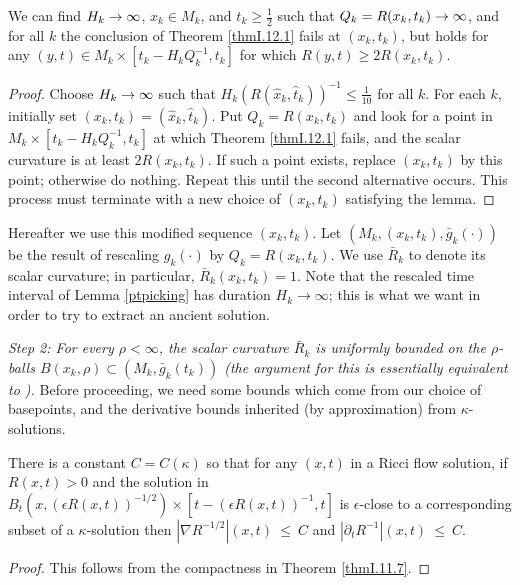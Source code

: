 \begin{lemma}
  \label{lem:kl-canonical-neighborhood-theorem-canonical-neighborhoods-lemma}
  \label{ptpicking}
We can find $H_k\rightarrow\infty$, $x_k\in M_k$, and $t_k\geq\frac{1}{2}$
such that $Q_k =  R(x_k,t_k)\rightarrow\infty$, and for all $k$
the conclusion of Theorem \ref{thmI.12.1} fails at $(x_k,t_k)$,
but holds for
any $(y,t)\in M_k\times[t_k-H_kQ_k^{-1},t_k]$
for which $R(y,t)\geq 2R(x_k,t_k)$.
\end{lemma}
\begin{proof}
Choose $H_k\rightarrow\infty$ such that
$H_k(R(\widehat{x}_k,\widehat{t}_k))^{-1}\leq \frac{1}{10}$
for all $k$.  For each $k$, initially set $(x_k,t_k) = (\hat x_k,\hat t_k)$.
Put $Q_k = R(x_k, t_k)$ and look for a point in
$M_k\times[t_k-H_kQ_k^{-1},t_k]$ at which
Theorem \ref{thmI.12.1} fails,
and the scalar curvature is at least $2R(x_k,t_k)$.
If such a point
exists, replace $(x_k,t_k)$  by this point; otherwise do nothing.
Repeat this until the second alternative occurs.
This process must terminate with a new choice of $(x_k,t_k)$
satisfying the lemma.
\end{proof}

Hereafter we use this modified sequence $(x_k, t_k)$.
Let $(M_k,(x_k,t_k),\bar g_k(\cdot))$ be the result of rescaling $g_k(\cdot)$
by $Q_k=R(x_k,t_k)$. We use $\bar R_k$ to denote its scalar curvature;
in particular, $\bar R_k (x_k, t_k) = 1$.
Note that the rescaled time interval of Lemma \ref{ptpicking}
has duration $H_k \rightarrow \infty$;
this is what we want in order to try to extract an ancient solution.

\bigskip
{\em Step 2: For every $\rho<\infty$, the scalar curvature $\bar R_k$
is uniformly bounded
on the $\rho$-balls $B(x_k,\rho)\subset (M_k,\bar g_k(t_k))$
(the argument for this is essentially equivalent to
\cite[Pf. of Claim 2 of Theorem I.12.1]{Perelman}).}
Before proceeding, we need some bounds which come from our choice
of basepoints, and the derivative bounds inherited (by approximation)
from $\kappa$-solutions.

\begin{lemma}
  \label{lem:kl-canonical-neighborhood-theorem-existence-canonical-neighborhoods}
 \label{grad}
There is a constant $C = C(\kappa)$ so that for any $(x, t)$ in a
Ricci flow solution, if $R(x, t) > 0$ and the solution in
$B_t(x, (\epsilon R(x, t))^{-1/2}) \times [t-(\epsilon R(x, t))^{-1}, t]$
is $\epsilon$-close to a corresponding subset of a $\kappa$-solution
then $|\nabla R^{-1/2}|(x, t) \: \le \: C$ and
$|\partial_t R^{-1}|(x,t) \: \le \: C$.
\end{lemma}
\begin{proof}
This follows from the compactness in Theorem \ref{thmI.11.7}.
\end{proof}

